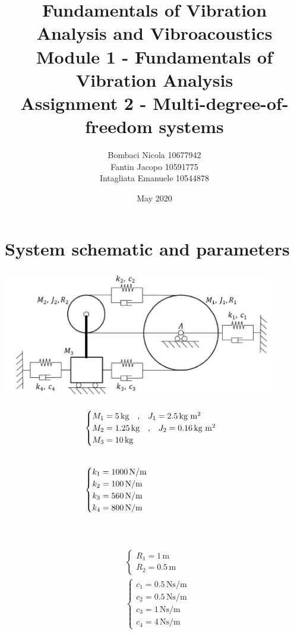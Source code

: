 \documentclass[a4paper,12pt,oneside]{article}
\title{Fundamentals of Vibration Analysis and Vibroacoustics \\
Module 1 - Fundamentals of Vibration Analysis \\
Assignment 2 - Multi-degree-of-freedom systems}
\author{Bombaci Nicola 10677942 \\
Fantin Jacopo 10591775 \\
Intagliata Emanuele 10544878}
\date{May 2020}
\begin{document}
\maketitle

\vspace{30pt}

\section*{System schematic and parameters}

\includegraphics[width=0.9\textwidth]{system_schematic}

\vspace{30pt}

\begin{minipage}{0.4\textwidth}
	\[ \begin{split}
		& \begin{cases}
			M_1 = 5 \, \text{kg} \quad \text{,} \quad
				J_1 = 2.5 \, \text{kg m $ \! \! ^2 $} \\
			M_2 = 1.25 \, \text{kg} \quad \text{,} \quad
				J_2 = 0.16 \, \text{kg m $ \! \! ^2 $} \\
			M_3 = 10 \, \text{kg}
		\end{cases} \\[20pt]
		& \begin{cases}
			k_1 = 1000 \, \text{N/m} \\
			k_2 = 100 \, \text{N/m} \\
			k_3 = 560 \, \text{N/m} \\
			k_4 = 800 \, \text{N/m}
		\end{cases} \\[30pt]
	\end{split} \]
\end{minipage}
\begin{minipage}{0.4\textwidth}
\vspace{-20pt}
	\[ \begin{split}
		& \begin{cases}
			R_1 = 1 \, \text{m} \\
			R_2 = 0.5 \, \text{m}
		\end{cases} \\[25pt]
		& \begin{cases}
			c_1 = 0.5 \, \text{Ns/m} \\
			c_2 = 0.5 \, \text{Ns/m} \\
			c_3 = 1 \, \text{Ns/m} \\
			c_4 = 4 \, \text{Ns/m}
		\end{cases}
	\end{split} \]
\end{minipage}
\end{document}

